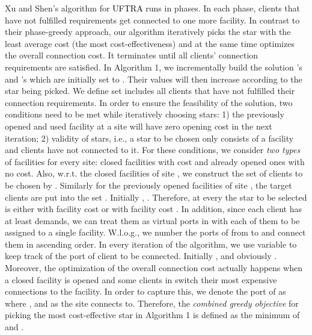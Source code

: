 \documentclass[10pt]{llncs}
\begin{document}
Xu and Shen's algorithm \cite{shihongftfa} for \textcolor{black}{UFTRA}
runs in phases. In each phase, clients that have not fulfilled requirements
get connected to one more facility. In contrast to their phase-greedy
approach, our algorithm iteratively picks the star with the least
average cost (the most cost-effectiveness) and at the same time optimizes
the overall connection cost. It terminates until all clients' connection
requirements are satisfied. In Algorithm 1, we incrementally build
the solution 's and 's which are initially set to
. Their values will then increase according to the star being
picked. We define set  includes all clients that have
not fulfilled their connection requirements. In order to ensure the
feasibility of the solution, two conditions need to be met while iteratively
choosing stars: 1) the previously opened and used facility at a site
will have zero opening cost in the next iteration; 2) validity of
stars, i.e., a star to be chosen only consists of a facility and clients
have not connected to it. For these conditions, we consider \textit{two
types} of facilities for every site: closed facilities with cost 
and already opened ones with no cost. Also, w.r.t. the closed facilities
of site , we construct the set of clients to be chosen by .
Similarly for the previously opened facilities of site , the target
clients are put into the set .
Initially , .
Therefore, at every  the star to be selected is either 
with facility cost  or 
with facility cost . In addition, since each client  has at
least  demands, we can treat them as virtual ports in 
with each of them to be assigned to a single facility. W.l.o.g., we
number the ports of  from  to  and connect them in
ascending order. In every iteration of the algorithm, we use variable
 to keep track of the port of client  to be connected.
Initially\textcolor{black}{{} },
and obviously .
Moreover, the optimization of the overall connection cost actually
happens when a closed facility is opened and some clients in 
switch their most expensive connections to the facility. In order
to capture this, we denote the port  of  as 
where , and 
as the site  connects to. Therefore, the\textit{
combined greedy objective} for picking the most cost-effective star
in Algorithm 1 is defined as the minimum of {\footnotesize }
and {\footnotesize }.
\end{document}
